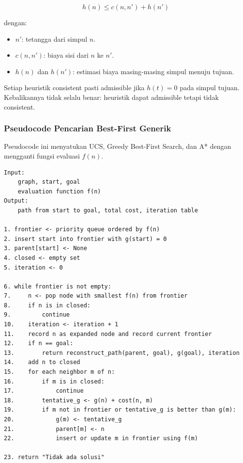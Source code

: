 \begin{equation}
    h(n) \le c(n,n') + h(n')
    \label{eq:rp-consistent}
\end{equation}

dengan:
\begin{itemize}
    \item $n'$: tetangga dari simpul $n$.
    \item $c(n,n')$: biaya sisi dari $n$ ke $n'$.
    \item $h(n)$ dan $h(n')$: estimasi biaya masing-masing simpul menuju tujuan.
\end{itemize}

Setiap heuristik consistent pasti admissible jika $h(t)=0$ pada simpul tujuan. Kebalikannya tidak selalu benar: heuristik dapat admissible tetapi tidak consistent.

\subsubsection{Pseudocode Pencarian Best-First Generik}

\begin{jawab}
Pseudocode ini menyatukan UCS, Greedy Best-First Search, dan A* dengan mengganti fungsi evaluasi $f(n)$.
\end{jawab}

\begin{lstlisting}[caption={Pseudocode pencarian best-first untuk route planning}, label={lst:route-planning-best-first}]
Input:
    graph, start, goal
    evaluation function f(n)
Output:
    path from start to goal, total cost, iteration table

1. frontier <- priority queue ordered by f(n)
2. insert start into frontier with g(start) = 0
3. parent[start] <- None
4. closed <- empty set
5. iteration <- 0

6. while frontier is not empty:
7.     n <- pop node with smallest f(n) from frontier
8.     if n is in closed:
9.         continue
10.    iteration <- iteration + 1
11.    record n as expanded node and record current frontier
12.    if n == goal:
13.        return reconstruct_path(parent, goal), g(goal), iteration
14.    add n to closed
15.    for each neighbor m of n:
16.        if m is in closed:
17.            continue
18.        tentative_g <- g(n) + cost(n, m)
19.        if m not in frontier or tentative_g is better than g(m):
20.            g(m) <- tentative_g
21.            parent[m] <- n
22.            insert or update m in frontier using f(m)

23. return "Tidak ada solusi"
\end{lstlisting}

